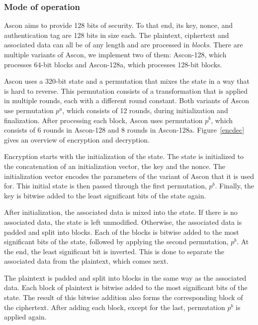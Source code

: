 \subsubsection{Mode of operation}

Ascon aims to provide 128 bits of security. To that end, its key, nonce, and
authentication tag are 128 bits in size each. The plaintext, ciphertext and
associated data can all be of any length and are processed in \emph{blocks}.
There are multiple variants of Ascon, we implement two of them: Ascon-128, which
processes 64-bit blocks and Ascon-128a, which processes 128-bit blocks.

Ascon uses a 320-bit state and a permutation that mixes the state in a way that
is hard to reverse. This permutation consists of a transformation that is
applied in multiple rounds, each with a different round constant. Both variants
of Ascon use permutation $p^a$, which consists of 12 rounds, during
initialization and finalization. After processing each block, Ascon uses
permutation $p^b$, which consists of 6 rounds in Ascon-128 and 8 rounds in
Ascon-128a. Figure~\ref{encdec} gives an overview of encryption and decryption.



Encryption starts with the initialization of the state. The state is initialized
to the concatenation of an initialization vector, the key and the nonce. The
initialization vector encodes the parameters of the variant of Ascon that it is
used for. This initial state is then passed through the first permutation,
$p^b$. Finally, the key is bitwise added to the least significant bits of the
state again.

After initialization, the associated data is mixed into the state. If there is
no associated data, the state is left unmodified. Otherwise, the associated data
is padded and split into blocks. Each of the blocks is bitwise added to the most
significant bits of the state, followed by applying the second permutation,
$p^b$. At the end, the least significant bit is inverted. This is done to
separate the associated data from the plaintext, which comes next.

The plaintext is padded and split into blocks in the same way as the associated
data. Each block of plaintext is bitwise added to the most significant bits of
the state. The result of this bitwise addition also forms the corresponding
block of the ciphertext. After adding each block, except for the last,
permutation $p^b$ is applied again.

